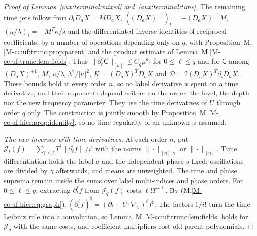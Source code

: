 \documentclass[11pt]{amsart}
\numberwithin{equation}{section}
\begin{document}
\begin{proof}[Proof of Lemmas~\ref{aux:terminal:mixed} and~\ref{aux:terminal:time}]
The remaining time jets follow from $\partial_t D_aX=MD_aX$, $((D_aX)^{-1})_t=-(D_aX)^{-1}M$,
$(\kappa/\lambda)_t=-M^T\kappa/\lambda$ and the differentiated inverse identities of
reciprocal coefficients, by a number of operations depending only on $q$, with
Proposition~M.\ref{M-cc:uf:trunc:prop:parent} and the product
estimate of Lemma~M.\ref{M-cc:uf:trunc:lem:fields}. Thus
$\|\partial_t^\ell\mathsf C\|_{[n]}\le C_q\mu^{a_q}$ for $0\le\ell\le q$ and
for $\mathsf C$ among $(D_aX)^{\pm1}$, $M$, $\kappa/\lambda$,
$\lambda^2/|\kappa|^2$, $K=(D_aX)^TD_aX$ and $\mathcal D=2(D_aX)^T\partial_t D_aX$. These bounds hold
at every order $n$, so no label derivative is
spent on a time
derivative, and their exponents depend neither on the order, the level, the depth nor the
new frequency parameter. They use the time derivatives of $U$ through
order $q$ only. The construction is jointly smooth by
Proposition~M.\ref{M-cc:uf:hier:prop:identity}, so no time regularity of an unknown
is assumed.

\emph{The two inverses with time derivatives.} At each order $n$, put
$\mathcal J_l(f)=\sum_{i\le l}T^i\|\partial_t^if\|/i!$
with the norms $\|\cdot\|_{[n],\gamma}$ or $\|\cdot\|_{[n]}$. Time differentiation holds the label
$a$ and the independent phase $s$ fixed; oscillations are divided by
$\gamma$ afterwards, and means are unweighted. The time and phase
suprema remain inside the sums over label multi-indices and phase orders. For $0\le\ell\le q$,
extracting $\partial_t^\ell f$ from $\mathcal J_q(f)$ costs
$\ell!T^{-\ell}$. By \textup{(M.\ref{M-cc:uf:hier:eq:graph})},
$(\partial_t^\ell f)^\natural
=(\partial_t+U\cdot\nabla_x)^\ell f^\natural$.
The factors $1/i!$ turn the time Leibniz rule into a convolution, so
Lemma~M.\ref{M-cc:uf:trunc:lem:fields} holds for $\mathcal J_q$ with the same
costs, and coefficient multipliers cost old-parent
polynomials.


\end{proof}
\end{document}

